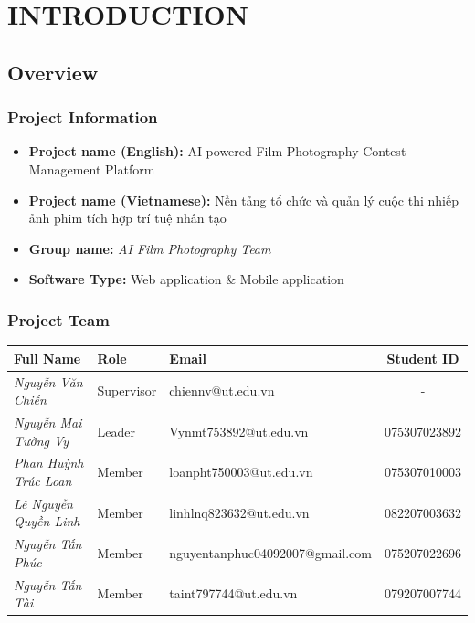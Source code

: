 \chapter{INTRODUCTION}

\section{Overview}
\subsection{Project Information}
\begin{itemize}
    \item \textbf{Project name (English):} AI-powered Film Photography Contest Management Platform
    \item \textbf{Project name (Vietnamese):} Nền tảng tổ chức và quản lý cuộc thi nhiếp ảnh phim tích hợp trí tuệ nhân tạo
    \item \textbf{Group name:} \textit{AI Film Photography Team}
    \item \textbf{Software Type:} Web application \& Mobile application
\end{itemize}

\subsection{Project Team}
\begin{table}[H]
\centering
\renewcommand{\arraystretch}{1.2}
\begin{tabular}{|p{4.2cm}|l|p{5.5cm}|c|}
\hline
\textbf{Full Name} & \textbf{Role} & \textbf{Email} & \textbf{Student ID} \\ \hline
\textit{Nguyễn Văn Chiến} & Supervisor & chiennv@ut.edu.vn & - \\ \hline
\textit{Nguyễn Mai Tường Vy} & Leader & Vynmt753892@ut.edu.vn & 075307023892 \\ \hline
\textit{Phan Huỳnh Trúc Loan} & Member & loanpht750003@ut.edu.vn & 075307010003 \\ \hline
\textit{Lê Nguyễn Quyền Linh} & Member & linhlnq823632@ut.edu.vn & 082207003632 \\ \hline
\textit{Nguyễn Tấn Phúc} & Member & nguyentanphuc04092007@gmail.com & 075207022696 \\ \hline
\textit{Nguyễn Tấn Tài} & Member & taint797744@ut.edu.vn & 079207007744 \\ \hline
\end{tabular}
\end{table}

